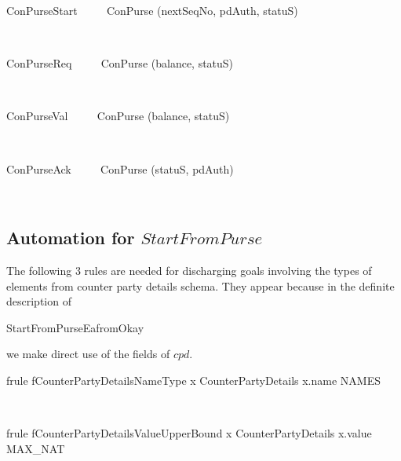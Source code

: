 \begin{LSDef}
\begin{zed}
   ConPurseStart ~~~~ ConPurse \hide (nextSeqNo, pdAuth, statuS)
\end{zed}~\end{LSDef}

\begin{LSDef}
\begin{zed}
   ConPurseReq ~~~~ ConPurse \hide (balance, statuS)
\end{zed}~\end{LSDef}

\begin{LSDef}
\begin{zed}
   ConPurseVal ~~~~ ConPurse \hide (balance, statuS)
\end{zed}~\end{LSDef}

\begin{LSDef}
\begin{zed}
   ConPurseAck ~~~~ ConPurse \hide (statuS, pdAuth)
\end{zed}~\end{LSDef}

\subsection*{Automation for $StartFromPurse$}

The following $3$ rules are needed for discharging goals involving the types of elements
from counter party details schema. They appear because in the definite description of
\begin{gzed} StartFromPurseEafromOkay \end{gzed} we make direct use of the fields of $cpd$.
%
\begin{LFRT}
\begin{theorem}{frule fCounterPartyDetailsNameType}
   x \in CounterPartyDetails \implies x.name \in NAMES
\end{theorem}~\end{LFRT}

\begin{LFRT}
\begin{theorem}{frule fCounterPartyDetailsValueUpperBound}
   x \in CounterPartyDetails \implies x.value \leq MAX\_NAT
\end{theorem}~\end{LFRT}

